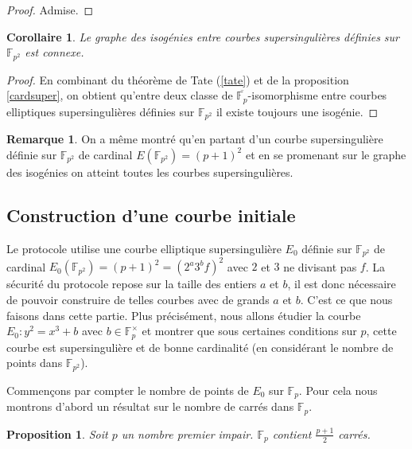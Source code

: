\documentclass{article}
\theoremstyle{plain}%
\newtheorem{prop}[thm]{Proposition}
\newtheorem{cor}[thm]{Corollaire}
\theoremstyle{definition}%
\newtheorem{rem}[thm]{Remarque}
\newcommand{\F}{\mathbb{F}}
\begin{document}
\begin{proof}
  Admise.
\end{proof}


\begin{cor}
  Le graphe des isogénies entre courbes supersingulières définies sur $\F_{p^2}$ est connexe.
\end{cor}

\begin{proof}
  En combinant du théorème de Tate (\ref{tate}) et de la proposition \ref{cardsuper}, on obtient qu'entre deux classe de $\overline{\F_p}$-isomorphisme entre courbes elliptiques supersingulières définies sur $\F_{p^2}$ il existe toujours une isogénie.
\end{proof}

\begin{rem}
  On a même montré qu'en partant d'un courbe supersingulière définie sur $\F_{p^2}$ de cardinal $E(\F_{p^2}) = (p+1)^2$ et en se promenant sur le graphe des isogénies on atteint toutes les courbes supersingulières.
\end{rem}



\subsection{Construction d'une courbe initiale}
\label{init}

Le protocole utilise une courbe elliptique supersingulière $E_0$ définie sur $\F_{p^2}$ de cardinal $E_0(\F_{p^2}) = (p+1)^2 =(2^a3^bf)^2$ avec $2$ et $3$ ne divisant pas $f$. La sécurité du protocole repose sur la taille des entiers $a$ et $b$, il est donc nécessaire de pouvoir construire de telles courbes avec de grands $a$ et $b$. C'est ce que nous faisons dans cette partie.
Plus précisément, nous allons étudier la courbe $E_0 : y^2 = x^3 + b$ avec $b\in\F_{p}^\times$ et montrer que sous certaines conditions sur $p$, cette courbe est supersingulière et de bonne cardinalité (en considérant le nombre de points dans $\F_{p^2}$).


Commençons par compter le nombre de points de $E_0$ sur $\F_{p}$. Pour cela nous montrons d'abord un résultat sur le nombre de carrés dans $\F_{p}$.

\begin{prop}
  Soit $p$ un nombre premier impair. $\F_{p}$ contient $\frac{p+1}{2}$ carrés.
\end{prop}
\end{document}
